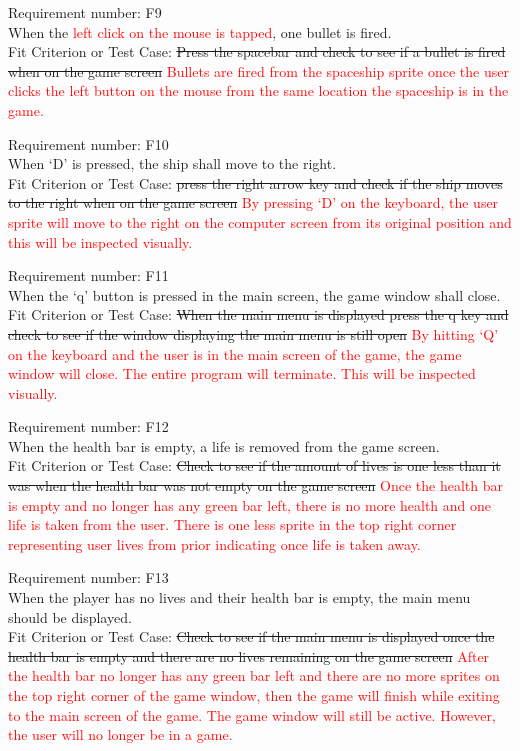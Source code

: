 \documentclass[12pt, titlepage]{article}
\begin{document}
\noindent Requirement number: F9
\\When the \textcolor{red}{left click on the mouse is tapped}, one bullet is fired.
\\Fit Criterion or Test Case: \sout{Press the spacebar and check to see if a bullet is fired when on the game screen}
\textcolor{red}{Bullets are fired from the spaceship sprite once the user clicks the left button on the mouse from the same location the spaceship is in the game.}
\bigskip

\noindent Requirement number: F10
\\When `D' is pressed, the ship shall move to the right.
\\Fit Criterion or Test Case: \sout{press the right arrow key and check if the ship moves to the right when on the game screen}
\textcolor{red}{By pressing `D' on the keyboard, the user sprite will move to the right on the computer screen from its original position and this will be inspected visually.}
\bigskip

\noindent Requirement number: F11
\\When the `q' button is pressed in the main screen, the game window shall close.
\\Fit Criterion or Test Case: \sout{When the main menu is displayed press the q key and check to see if the window displaying the main menu is still open}
\textcolor{red}{By hitting `Q' on the keyboard and the user is in the main screen of the game, the game window will close. The entire program will terminate. This will be inspected visually. }
\bigskip

\noindent Requirement number: F12
\\When the health bar is empty, a life is removed from the game screen.
\\Fit Criterion or Test Case: \sout{Check to see if the amount of lives is one less than it was when the health bar was not empty on the game screen}
\textcolor{red}{Once the health bar is empty and no longer has any green bar left, there is no more health and one life is taken from the user. There is one less sprite in the top right corner representing user lives from prior indicating once life is taken away.}
\bigskip

\noindent Requirement number: F13
\\When the player has no lives and their health bar is empty, the main menu should be displayed.
\\Fit Criterion or Test Case: \sout{Check to see if the main menu is displayed once the health bar is empty and there are no lives remaining on the game screen}
\textcolor{red}{After the health bar no longer has any green bar left and there are no more sprites on the top right corner of the game window, then the game will finish while exiting to the main screen of the game. The game window will still be active. However, the user will no longer be in a game.}
\bigskip
\end{document}
